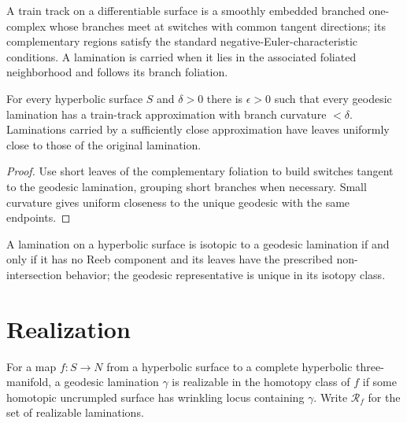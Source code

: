 \begin{definition}
\label{thurston-ch08-train-track}
A train track on a differentiable surface is a smoothly embedded branched one-complex whose branches meet at switches with common tangent directions; its complementary regions satisfy the standard negative-Euler-characteristic conditions.  A lamination is carried when it lies in the associated foliated neighborhood and follows its branch foliation.
\end{definition}

\begin{proposition}
\label{thurston-ch08-train-track-approximation}
For every hyperbolic surface $S$ and $\delta>0$ there is $\epsilon>0$ such that every geodesic lamination has a train-track approximation with branch curvature $<\delta$.  Laminations carried by a sufficiently close approximation have leaves uniformly close to those of the original lamination.
\end{proposition}
\begin{proof}\sketch Use short leaves of the complementary foliation to build switches tangent to the geodesic lamination, grouping short branches when necessary.  Small curvature gives uniform closeness to the unique geodesic with the same endpoints.\end{proof}

\begin{proposition}
\label{thurston-ch08-geodesic-representative}
A lamination on a hyperbolic surface is isotopic to a geodesic lamination if and only if it has no Reeb component and its leaves have the prescribed non-intersection behavior; the geodesic representative is unique in its isotopy class.
\end{proposition}

\section{Realization}

\begin{definition}
\label{thurston-ch08-realizable-lamination}
For a map $f:S\to N$ from a hyperbolic surface to a complete hyperbolic three-manifold, a geodesic lamination $\gamma$ is realizable in the homotopy class of $f$ if some homotopic uncrumpled surface has wrinkling locus containing $\gamma$.  Write $\mathcal R_f$ for the set of realizable laminations.
\end{definition}

